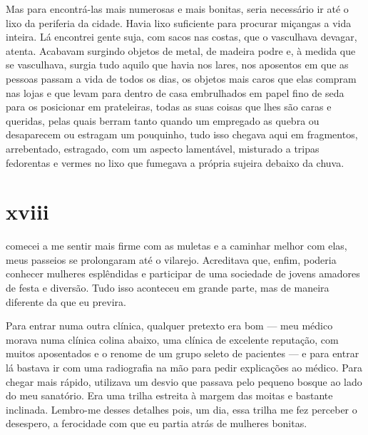 Mas para encontrá-las mais numerosas e mais bonitas, seria necessário ir
até o lixo da periferia da cidade. Havia lixo suficiente para procurar
miçangas a vida inteira. Lá encontrei gente suja, com sacos nas costas,
que o vasculhava devagar, atenta. Acabavam surgindo objetos de metal, de
madeira podre e, à medida que se vasculhava, surgia tudo aquilo que
havia nos lares, nos aposentos em que as pessoas passam a vida de todos
os dias, os objetos mais caros que elas compram nas lojas e que levam
para dentro de casa embrulhados em papel fino de seda para os posicionar
em prateleiras, todas as suas coisas que lhes são caras e queridas,
pelas quais berram tanto quando um empregado as quebra ou desaparecem ou
estragam um pouquinho, tudo isso chegava aqui em fragmentos,
arrebentado, estragado, com um aspecto lamentável, misturado a tripas
fedorentas e vermes no lixo que fumegava a própria sujeira debaixo da
chuva.



\section{xviii}

 comecei a me sentir mais firme com as muletas e a caminhar melhor
com elas, meus passeios se prolongaram até o vilarejo. Acreditava que,
enfim, poderia conhecer mulheres esplêndidas e participar de uma
sociedade de jovens amadores de festa e diversão. Tudo isso aconteceu em
grande parte, mas de maneira diferente da que eu previra.

Para entrar numa outra clínica, qualquer pretexto era bom --- meu médico
morava numa clínica colina abaixo, uma clínica de excelente reputação,
com muitos aposentados e o renome de um grupo seleto de pacientes --- e
para entrar lá bastava ir com uma radiografia na mão para pedir
explicações ao médico. Para chegar mais rápido, utilizava um desvio que
passava pelo pequeno bosque ao lado do meu sanatório. Era uma trilha
estreita à margem das moitas e bastante inclinada. Lembro-me desses
detalhes pois, um dia, essa trilha me fez perceber o desespero, a
ferocidade com que eu partia atrás de mulheres bonitas.

